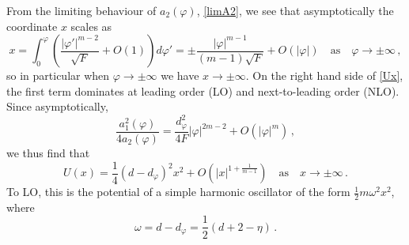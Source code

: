 \documentclass[11pt,a4paper]{article}
\numberwithin{figure}{section}
\numberwithin{equation}{section}
\newcommand{\be}{\begin{equation}}
\newcommand{\ee}{\end{equation}}
\newcommand{\ph}{\varphi}
\begin{document}
From the limiting behaviour of $a_2(\ph)$, \eqref{limA2}, we see that asymptotically the coordinate $x$ scales as
\begin{equation}
\label{largex}
    x = \int_0^\ph \left( \frac{|\ph'|^{m-2}}{\sqrt{F}} + O(1) \right) d\ph' = \pm \frac{|\ph|^{m-1}}{(m-1)\sqrt{F}} +O(|\ph|) \quad \text{as} \quad \ph \rightarrow \pm\infty \,,
\end{equation}
so in particular when $\ph \rightarrow \pm \infty$ we have $x\rightarrow \pm \infty$.
On the right hand side of \eqref{Ux}, the first term dominates at leading order (LO) and next-to-leading order (NLO). Since asymptotically,
\be \frac{a_1^2(\ph)}{4a_2(\ph)}=\frac{d_\ph^2}{4F}|\ph|^{2m-2} +O(|\ph|^m)\,, \ee
we thus find that
\begin{equation} \label{Uasymp}
    U(x) = \frac{1}{4}(d-d_\ph)^2 x^2 +O(|x|^{1 + \frac{1}{m-1}}) \quad \text{as} \quad x \rightarrow \pm \infty \,.
\end{equation}
To LO, this is the potential of a simple harmonic oscillator of the form $\frac{1}{2}m\omega^2x^2$, where 
\be \label{omega}\omega = d-d_\ph = \frac12(d+2-\eta)\,. \ee
\end{document}
